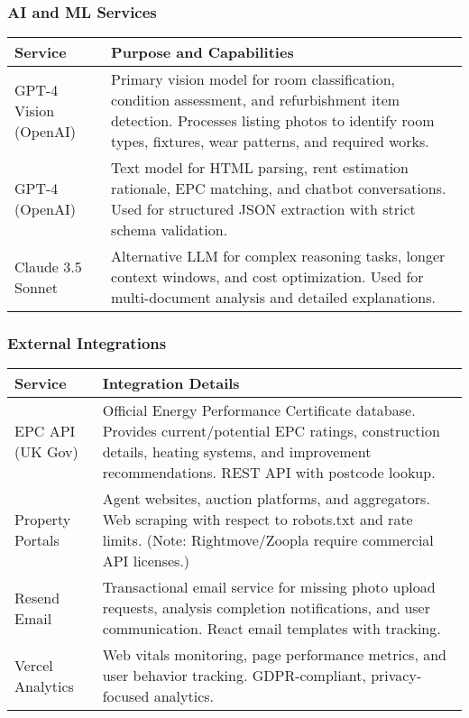 \documentclass[11pt,a4paper]{article}
\begin{document}
\subsubsection{AI and ML Services}

\begin{longtable}{@{}p{3.5cm}p{11cm}@{}}
\toprule
\textbf{Service} & \textbf{Purpose and Capabilities} \\
\midrule
GPT-4 Vision (OpenAI) & Primary vision model for room classification, condition assessment, and refurbishment item detection. Processes listing photos to identify room types, fixtures, wear patterns, and required works. \\
\addlinespace
GPT-4 (OpenAI) & Text model for HTML parsing, rent estimation rationale, EPC matching, and chatbot conversations. Used for structured JSON extraction with strict schema validation. \\
\addlinespace
Claude 3.5 Sonnet & Alternative LLM for complex reasoning tasks, longer context windows, and cost optimization. Used for multi-document analysis and detailed explanations. \\
\bottomrule
\end{longtable}

\subsubsection{External Integrations}

\begin{longtable}{@{}p{3.5cm}p{11cm}@{}}
\toprule
\textbf{Service} & \textbf{Integration Details} \\
\midrule
EPC API (UK Gov) & Official Energy Performance Certificate database. Provides current/potential EPC ratings, construction details, heating systems, and improvement recommendations. REST API with postcode lookup. \\
\addlinespace
Property Portals & Agent websites, auction platforms, and aggregators. Web scraping with respect to robots.txt and rate limits. (Note: Rightmove/Zoopla require commercial API licenses.) \\
\addlinespace
Resend Email & Transactional email service for missing photo upload requests, analysis completion notifications, and user communication. React email templates with tracking. \\
\addlinespace
Vercel Analytics & Web vitals monitoring, page performance metrics, and user behavior tracking. GDPR-compliant, privacy-focused analytics. \\
\bottomrule
\end{longtable}
\end{document}
